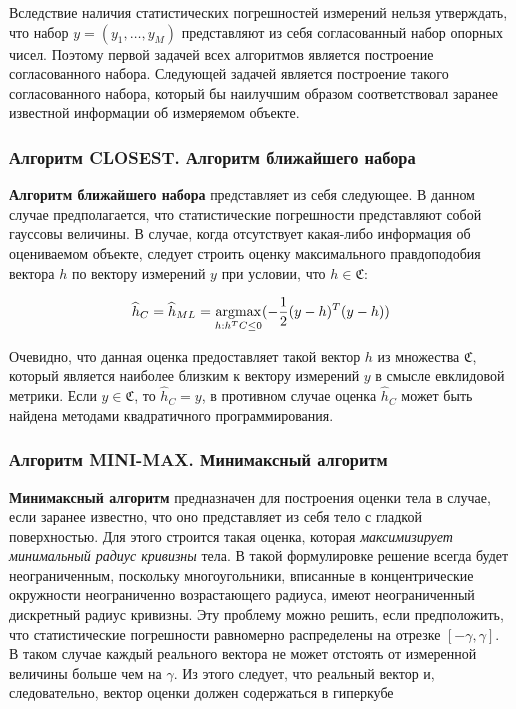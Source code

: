 \documentclass[a4paper, 12pt, titlepage]{article}
\theoremstyle{definition}
\theoremstyle{plain}
\begin{document}
Вследствие наличия статистических погрешностей измерений нельзя утверждать, что
набор $y = (y_{1}, \ldots, y_{M})$ представляют из себя согласованный набор
опорных чисел. Поэтому первой задачей всех алгоритмов является построение
согласованного набора. Следующей задачей является построение такого
согласованного набора, который бы наилучшим образом соответствовал заранее
известной информации об измеряемом объекте.

\subsubsection{Алгоритм CLOSEST. Алгоритм ближайшего набора}
\label{sec:history/PrinceW90/algo-CLOSEST}

\textbf{Алгоритм ближайшего набора} представляет из себя следующее. В данном
случае предполагается, что статистические погрешности представляют собой
гауссовы величины. В случае, когда отсутствует какая-либо информация об
оцениваемом объекте, следует строить оценку максимального правдоподобия вектора
$h$ по вектору измерений $y$ при условии, что $h \in \mathfrak{C}$:

\begin{equation}
\widehat{h}_{C} = \widehat{h}_{ML} =
\operatornamewithlimits{argmax}_{h: h^{T} C \leq 0}
( - \frac{1}{2} (y - h)^{T} (y - h))
\end{equation}

Очевидно, что данная оценка предоставляет такой вектор $h$ из множества
$\mathfrak{C}$, который является наиболее близким к вектору измерений $y$ в
смысле евклидовой метрики. Если $y \in \mathfrak{C}$, то $\widehat{h}_{C} = y$,
в противном случае оценка $\widehat{h}_{C}$ может быть найдена методами
квадратичного программирования.

\subsubsection{Алгоритм MINI-MAX. Минимаксный алгоритм}
\label{sec:history/PrinceW90/algo-MINI-MAX}


\textbf{Минимаксный алгоритм} предназначен для построения
оценки тела в случае, если заранее известно, что оно представляет из себя тело
с гладкой поверхностью. Для этого строится такая оценка, которая
\textit{максимизирует минимальный радиус кривизны} тела. В такой формулировке
решение всегда будет неограниченным, поскольку многоугольники, вписанные в
концентрические окружности неограниченно возрастающего радиуса, имеют
неограниченный дискретный радиус кривизны. Эту проблему можно решить, если
предположить, что статистические погрешности равномерно распределены на отрезке
$[ - \gamma, \gamma]$. В таком случае каждый реального вектора не может
отстоять от измеренной величины больше чем на $\gamma$. Из этого следует, что
реальный вектор и, следовательно, вектор оценки должен содержаться в гиперкубе
\end{document}
